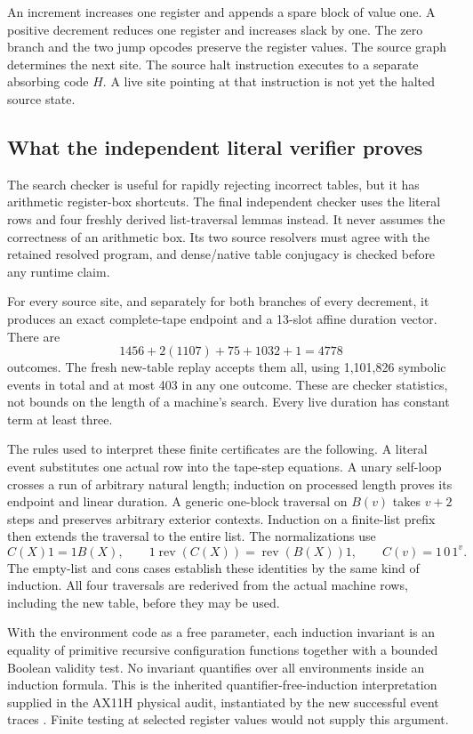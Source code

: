 \documentclass[10pt,a4paper]{article}
\theoremstyle{definition}
\begin{document}
An increment increases one register and appends a spare block of value
one. A positive decrement reduces one register and increases slack by
one. The zero branch and the two jump opcodes preserve the register
values. The source graph determines the next site. The source halt
instruction executes to a separate absorbing code $H$. A live site
pointing at that instruction is not yet the halted source state.

\subsection{What the independent literal verifier proves}

The search checker is useful for rapidly rejecting incorrect tables,
but it has arithmetic register-box shortcuts. The final independent
checker uses the literal rows and four freshly derived list-traversal
lemmas instead. It never assumes the correctness of an arithmetic box.
Its two source resolvers must agree with the retained resolved program,
and dense/native table conjugacy is checked before any runtime claim.

For every source site, and separately for both branches of every
decrement, it produces an exact complete-tape endpoint and a 13-slot
affine duration vector. There are
\[
 1456+2(1107)+75+1032+1=4778
\]
outcomes. The fresh new-table replay accepts them all, using 1,101,826
symbolic events in total and at most 403 in any one outcome. These are
checker statistics, not bounds on the length of a machine's search.
Every live duration has constant term at least three.

The rules used to interpret these finite certificates are the following.
A literal event substitutes one actual row into the tape-step equations.
A unary self-loop crosses a run of arbitrary natural length; induction
on processed length proves its endpoint and linear duration. A generic
one-block traversal on $B(v)$ takes $v+2$ steps and preserves arbitrary
exterior contexts. Induction on a finite-list prefix then extends the
traversal to the entire list. The normalizations use
\[
 C(X)1=1B(X),\qquad
 1\operatorname{rev}(C(X))=\operatorname{rev}(B(X))1,
 \qquad C(v)=1\,0\,1^v.
\]
The empty-list and cons cases establish these identities by the same
kind of induction. All four traversals are rederived from the actual
machine rows, including the new table, before they may be used.

With the environment code as a free parameter, each induction invariant
is an equality of primitive recursive configuration functions together
with a bounded Boolean validity test. No invariant quantifies over all
environments inside an induction formula. This is the inherited
quantifier-free-induction interpretation supplied in the AX11H physical
audit, instantiated by the new successful event traces \cite{ax11h}.
Finite testing at selected register values would not supply this argument.
\end{document}
